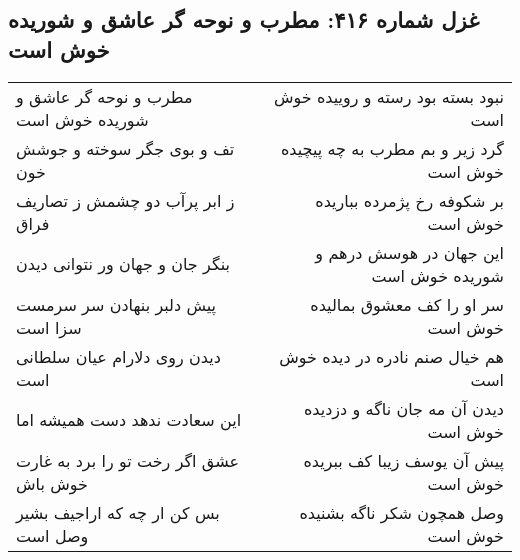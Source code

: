 \begin{center}
\section*{غزل شماره ۴۱۶: مطرب و نوحه گر عاشق و شوریده خوش است}
\label{sec:0416}
\begin{longtable}{l p{0.5cm} r}
مطرب و نوحه گر عاشق و شوریده خوش است
&&
نبود بسته بود رسته و روییده خوش است
\\
تف و بوی جگر سوخته و جوشش خون
&&
گرد زیر و بم مطرب به چه پیچیده خوش است
\\
ز ابر پرآب دو چشمش ز تصاریف فراق
&&
بر شکوفه رخ پژمرده بباریده خوش است
\\
بنگر جان و جهان ور نتوانی دیدن
&&
این جهان در هوسش درهم و شوریده خوش است
\\
پیش دلبر بنهادن سر سرمست سزا است
&&
سر او را کف معشوق بمالیده خوش است
\\
دیدن روی دلارام عیان سلطانی است
&&
هم خیال صنم نادره در دیده خوش است
\\
این سعادت ندهد دست همیشه اما
&&
دیدن آن مه جان ناگه و دزدیده خوش است
\\
عشق اگر رخت تو را برد به غارت خوش باش
&&
پیش آن یوسف زیبا کف ببریده خوش است
\\
بس کن ار چه که اراجیف بشیر وصل است
&&
وصل همچون شکر ناگه بشنیده خوش است
\\
\end{longtable}
\end{center}
